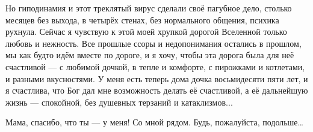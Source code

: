 Но гиподинамия и этот треклятый вирус сделали своё пагубное дело, столько
месяцев без выхода,  в четырёх стенах,  без нормального общения,  психика
рухнула.  Сейчас я чувствую к этой моей хрупкой дорогой Вселенной только любовь
и нежность. Все прошлые ссоры и недопонимания остались в прошлом, мы как будто
идём вместе по дороге, и я хочу, чтобы эта дорога была для неё счастливой — с
любимой дочкой,  в тепле и комфорте, с пирожками и котлетами, и разными
вкусностями. У меня есть теперь дома дочка восьмидесяти пяти лет, и я
счастлива, что Бог дал мне возможность делать её  счастливой, а её дальнейшую
жизнь — спокойной, без душевных терзаний и катаклизмов... 

Мама, спасибо, что ты — у меня! Со мной рядом.  Будь, пожалуйста, подольше…
